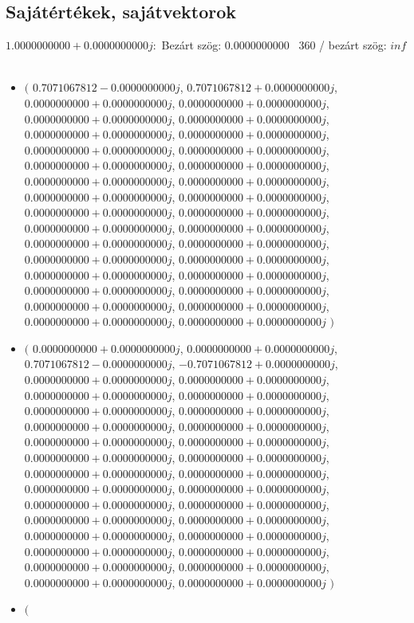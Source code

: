 \documentclass[14pt,a4paper]{article}
\begin{document}
\subsection{Sajátértékek, sajátvektorok}
$1.0000000000+0.0000000000j$:\
Bezárt szög: $0.0000000000$ \
360 / bezárt szög: $inf$\
\begin{itemize}
\item
$\big($
$0.7071067812-0.0000000000j$, $0.7071067812+0.0000000000j$, $0.0000000000+0.0000000000j$, $0.0000000000+0.0000000000j$, $0.0000000000+0.0000000000j$, $0.0000000000+0.0000000000j$, $0.0000000000+0.0000000000j$, $0.0000000000+0.0000000000j$, $0.0000000000+0.0000000000j$, $0.0000000000+0.0000000000j$, $0.0000000000+0.0000000000j$, $0.0000000000+0.0000000000j$, $0.0000000000+0.0000000000j$, $0.0000000000+0.0000000000j$, $0.0000000000+0.0000000000j$, $0.0000000000+0.0000000000j$, $0.0000000000+0.0000000000j$, $0.0000000000+0.0000000000j$, $0.0000000000+0.0000000000j$, $0.0000000000+0.0000000000j$, $0.0000000000+0.0000000000j$, $0.0000000000+0.0000000000j$, $0.0000000000+0.0000000000j$, $0.0000000000+0.0000000000j$, $0.0000000000+0.0000000000j$, $0.0000000000+0.0000000000j$, $0.0000000000+0.0000000000j$, $0.0000000000+0.0000000000j$, $0.0000000000+0.0000000000j$, $0.0000000000+0.0000000000j$, $0.0000000000+0.0000000000j$, $0.0000000000+0.0000000000j$
$\big)$
\item
$\big($
$0.0000000000+0.0000000000j$, $0.0000000000+0.0000000000j$, $0.7071067812-0.0000000000j$, $-0.7071067812+0.0000000000j$, $0.0000000000+0.0000000000j$, $0.0000000000+0.0000000000j$, $0.0000000000+0.0000000000j$, $0.0000000000+0.0000000000j$, $0.0000000000+0.0000000000j$, $0.0000000000+0.0000000000j$, $0.0000000000+0.0000000000j$, $0.0000000000+0.0000000000j$, $0.0000000000+0.0000000000j$, $0.0000000000+0.0000000000j$, $0.0000000000+0.0000000000j$, $0.0000000000+0.0000000000j$, $0.0000000000+0.0000000000j$, $0.0000000000+0.0000000000j$, $0.0000000000+0.0000000000j$, $0.0000000000+0.0000000000j$, $0.0000000000+0.0000000000j$, $0.0000000000+0.0000000000j$, $0.0000000000+0.0000000000j$, $0.0000000000+0.0000000000j$, $0.0000000000+0.0000000000j$, $0.0000000000+0.0000000000j$, $0.0000000000+0.0000000000j$, $0.0000000000+0.0000000000j$, $0.0000000000+0.0000000000j$, $0.0000000000+0.0000000000j$, $0.0000000000+0.0000000000j$, $0.0000000000+0.0000000000j$
$\big)$
\item
$\big($

\end{itemize}
\end{document}
